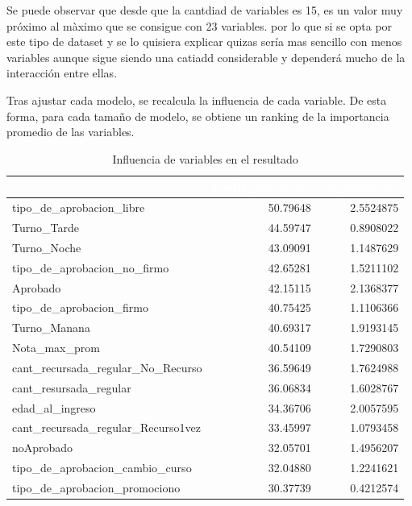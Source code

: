 \documentclass[]{article}
\begin{document}
Se puede observar que desde que la cantdiad de variables es 15, es un
valor muy próximo al màximo que se consigue con 23 variables. por lo que
si se opta por este tipo de dataset y se lo quisiera explicar quizas
sería mas sencillo con menos variables aunque sigue siendo una catiadd
considerable y dependerá mucho de la interacción entre ellas.

Tras ajustar cada modelo, se recalcula la influencia de cada variable.
De esta forma, para cada tamaño de modelo, se obtiene un ranking de la
importancia promedio de las variables.

\begin{table}[!h]

\caption{\label{tab:tf_rfe_influencia_variables_23}Influencia de variables en el resultado}
\centering
\begin{tabular}[t]{lrr}
\toprule
\rowcolor{black}  \multicolumn{1}{c}{\textcolor{white}{\textbf{var}}} & \multicolumn{1}{c}{\textcolor{white}{\textbf{media\_influencia}}} & \multicolumn{1}{c}{\textcolor{white}{\textbf{sd\_influencia}}}\\
\midrule
\rowcolor{gray!6}  tipo\_de\_aprobacion\_libre & 50.79648 & 2.5524875\\
Turno\_Tarde & 44.59747 & 0.8908022\\
\rowcolor{gray!6}  Turno\_Noche & 43.09091 & 1.1487629\\
tipo\_de\_aprobacion\_no\_firmo & 42.65281 & 1.5211102\\
\rowcolor{gray!6}  Aprobado & 42.15115 & 2.1368377\\
\addlinespace
tipo\_de\_aprobacion\_firmo & 40.75425 & 1.1106366\\
\rowcolor{gray!6}  Turno\_Manana & 40.69317 & 1.9193145\\
Nota\_max\_prom & 40.54109 & 1.7290803\\
\rowcolor{gray!6}  cant\_recursada\_regular\_No\_Recurso & 36.59649 & 1.7624988\\
cant\_resursada\_regular & 36.06834 & 1.6028767\\
\addlinespace
\rowcolor{gray!6}  edad\_al\_ingreso & 34.36706 & 2.0057595\\
cant\_recursada\_regular\_Recurso1vez & 33.45997 & 1.0793458\\
\rowcolor{gray!6}  noAprobado & 32.05701 & 1.4956207\\
tipo\_de\_aprobacion\_cambio\_curso & 32.04880 & 1.2241621\\
\rowcolor{gray!6}  tipo\_de\_aprobacion\_promociono & 30.37739 & 0.4212574\\

\end{tabular}
\end{table}
\end{document}
